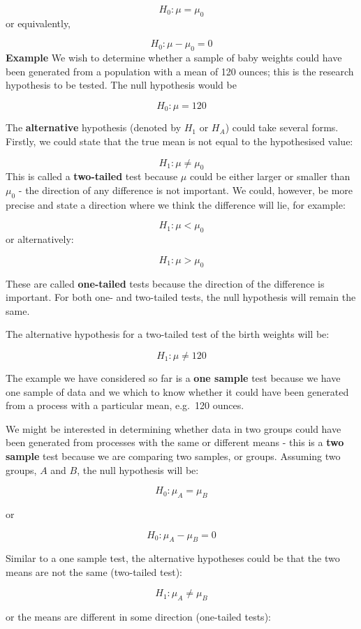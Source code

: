 \documentclass[
  oneside]{krantz}
\begin{document}
\[H_0: \mu = \mu_0\]
or equivalently,

\[H_0: \mu - \mu_0 = 0\]
\textbf{Example} We wish to determine whether a sample of baby weights could have been generated from a population with a mean of 120 ounces; this is the research hypothesis to be tested. The null hypothesis would be

\[H_0: \mu = 120\]

The \textbf{alternative} hypothesis (denoted by \(H_1\) or \(H_A\)) could take several forms. Firstly, we could state that the true mean is not equal to the hypothesised value:

\[H_1: \mu \ne \mu_0\]
This is called a \textbf{two-tailed} test because \(\mu\) could be either larger or smaller than \(\mu_0\) - the direction of any difference is not important. We could, however, be more precise and state a direction where we think the difference will lie, for example:

\[H_1: \mu < \mu_0\]
or alternatively:

\[H_1: \mu > \mu_0\]

These are called \textbf{one-tailed} tests because the direction of the difference is important. For both one- and two-tailed tests, the null hypothesis will remain the same.

The alternative hypothesis for a two-tailed test of the birth weights will be:

\[H_1: \mu \ne 120\]

The example we have considered so far is a \textbf{one sample} test because we have one sample of data and we which to know whether it could have been generated from a process with a particular mean, e.g.~120 ounces.

We might be interested in determining whether data in two groups could have been generated from processes with the same or different means - this is a \textbf{two sample} test because we are comparing two samples, or groups. Assuming two groups, \(A\) and \(B\), the null hypothesis will be:

\[H_0: \mu_A = \mu_B\]

or

\[H_0: \mu_A - \mu_B = 0\]

Similar to a one sample test, the alternative hypotheses could be that the two means are not the same (two-tailed test):

\[H_1: \mu_A \ne \mu_B\]

or the means are different in some direction (one-tailed tests):
\end{document}
